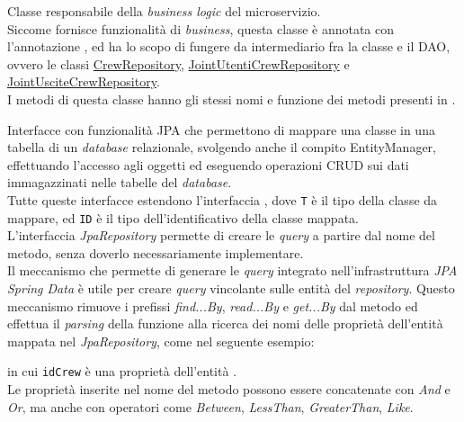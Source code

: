 Classe responsabile della \textit{business logic} del \gls{microservizio}.  \\
Siccome fornisce funzionalità di \textit{business}, questa classe è annotata con l'annotazione , ed ha lo scopo di fungere da intermediario fra la classe  e  il \gls{DAO}, ovvero le classi \hyperref[CrewRepository]{CrewRepository}, \hyperref[JointUtentiCrewRepository]{JointUtentiCrewRepository} e \hyperref[JointUsciteCrewRepository]{JointUsciteCrewRepository}. \\
I metodi di questa classe hanno gli stessi nomi e funzione dei metodi presenti in .

\label{Repository}
Interfacce con funzionalità \gls{JPA} che permettono di mappare una classe in una tabella di un \textit{database} relazionale, svolgendo anche il compito \gls{EntityManager}, effettuando l'accesso agli oggetti ed eseguendo operazioni \gls{CRUD} sui dati immagazzinati nelle tabelle del \textit{database}.\\
Tutte queste interfacce estendono l'interfaccia , dove \texttt{T} è il tipo della classe da mappare, ed \texttt{ID} è il tipo dell'identificativo della classe mappata.\\
L'interfaccia \textit{JpaRepository} permette di creare le \textit{query} a partire dal nome del metodo, senza doverlo necessariamente implementare.\\
Il meccanismo che permette di generare le \textit{query} integrato nell'infrastruttura \textit{JPA Spring Data} è utile per creare \textit{query} vincolante sulle entità del \textit{repository}. Questo meccanismo rimuove i prefissi \textit{find...By}, \textit{read...By} e \textit{get...By} dal metodo ed effettua il \textit{parsing} della funzione alla ricerca dei nomi delle proprietà dell'entità mappata nel \textit{JpaRepository}, come nel seguente esempio: 
\begin{center}
\end{center}
in cui \texttt{idCrew} è una proprietà dell'entità .\\ 
 Le proprietà inserite nel nome del metodo possono essere concatenate con \textit{And} e \textit{Or}, ma anche con operatori come \textit{Between}, \textit{LessThan}, \textit{GreaterThan}, \textit{Like}. \\
